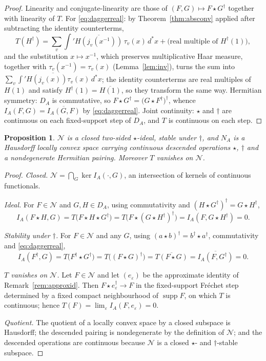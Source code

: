 \documentclass[11pt]{amsart}
\newtheorem{proposition}[theorem]{Proposition}
\theoremstyle{definition}
\theoremstyle{remark}
\newcommand{\dstar}{\,d^{*}}
\newcommand{\supp}{\operatorname{supp}}
\newcommand{\DA}{D_A}
\newcommand{\Nrad}{\mathcal N}
\begin{document}
\begin{proof}
Linearity and conjugate-linearity are those of $(F,G)\mapsto F\star G^{\dagger}$
together with linearity of $T$.  For \eqref{eq:daggerreal}: by
Theorem~\ref{thm:absconv} applied after subtracting the identity counterterms,
\[
T(H^{\dagger})=\sum_v\int'\overline{H(j_v(x^{-1}))}\,\tau_v(x)\dstar x
+\bigl(\text{real multiple of }H^{\dagger}(1)\bigr),
\]
and the substitution $x\mapsto x^{-1}$, which preserves multiplicative Haar
measure, together with $\tau_v(x^{-1})=\tau_v(x)$ (Lemma~\ref{lem:inv}), turns
the sum into $\overline{\sum_v\int'H(j_v(x))\tau_v(x)\dstar x}$; the identity
counterterms are real multiples of $H(1)$ and satisfy
$H^{\dagger}(1)=\overline{H(1)}$, so they transform the same way.  Hermitian
symmetry: $\DA$ is commutative, so
$F\star G^{\dagger}=\bigl(G\star F^{\dagger}\bigr)^{\dagger}$, whence
$I_A(F,G)=\overline{I_A(G,F)}$ by \eqref{eq:daggerreal}.  Joint continuity:
$\star$ and $\dagger$ are continuous on each fixed-support step of $\DA$, and
$T$ is continuous on each step.
\end{proof}

\begin{proposition}\label{prop:ideal}
$\Nrad$ is a closed two-sided $\star$-ideal, stable under $\dagger$, and $N_A$
is a Hausdorff locally convex space carrying continuous descended operations
$\star$, $\dagger$ and a nondegenerate Hermitian pairing.  Moreover $T$
vanishes on $\Nrad$.
\end{proposition}

\begin{proof}
\emph{Closed.}  $\Nrad=\bigcap_G\ker I_A(\cdot,G)$, an intersection of kernels
of continuous functionals.

\emph{Ideal.}  For $F\in\Nrad$ and $G,H\in\DA$, using commutativity and
$(H\star G^{\dagger})^{\dagger}=G\star H^{\dagger}$,
\[
I_A(F\star H,G)=T\bigl(F\star H\star G^{\dagger}\bigr)
=T\bigl(F\star(G\star H^{\dagger})^{\dagger}\bigr)=I_A(F,G\star H^{\dagger})=0 .
\]

\emph{Stability under $\dagger$.}  For $F\in\Nrad$ and any $G$, using
$(a\star b)^{\dagger}=b^{\dagger}\star a^{\dagger}$, commutativity and
\eqref{eq:daggerreal},
\[
I_A(F^{\dagger},G)=T\bigl(F^{\dagger}\star G^{\dagger}\bigr)
=T\bigl((F\star G)^{\dagger}\bigr)=\overline{T(F\star G)}
=\overline{I_A(F,G^{\dagger})}=0 .
\]

\emph{$T$ vanishes on $\Nrad$.}  Let $F\in\Nrad$ and let $(e_{\varepsilon})$ be
the approximate identity of Remark~\ref{rem:approxid}.  Then
$F\star e_{\varepsilon}^{\dagger}\to F$ in the fixed-support Fr\'echet step
determined by a fixed compact neighbourhood of $\supp F$, on which $T$ is
continuous; hence $T(F)=\lim_{\varepsilon}I_A(F,e_{\varepsilon})=0$.

\emph{Quotient.}  The quotient of a locally convex space by a closed subspace
is Hausdorff; the descended pairing is nondegenerate by the definition of
$\Nrad$; and the descended operations are continuous because $\Nrad$ is a
closed $\star$- and $\dagger$-stable subspace.
\end{proof}
\end{document}

